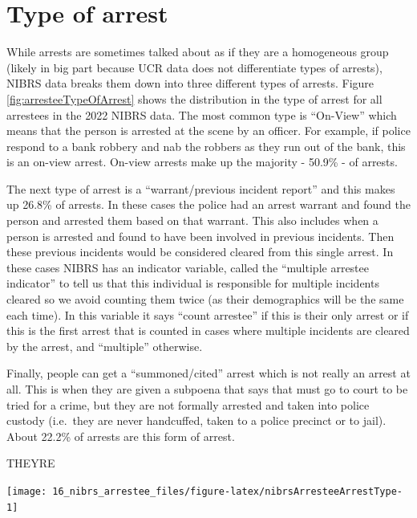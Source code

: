 \documentclass[
]{krantz}
\let\origfigure\figure
\let\endorigfigure\endfigure
\renewenvironment{figure}[1][2] {
    \expandafter\origfigure\expandafter[H]
} {
    \endorigfigure
}
\begin{document}
\section{Type of arrest}\label{type-of-arrest}

While arrests are sometimes talked about as if they are a
homogeneous group (likely in big part because UCR data does
not differentiate types of arrests), NIBRS data breaks them
down into three different types of arrests. Figure
\ref{fig:arresteeTypeOfArrest} shows the distribution in the
type of arrest for all arrestees in the 2022 NIBRS data. The
most common type is ``On-View'' which means that the person
is arrested at the scene by an officer. For example, if
police respond to a bank robbery and nab the robbers as they
run out of the bank, this is an on-view arrest. On-view
arrests make up the majority - 50.9\% - of arrests.

The next type of arrest is a ``warrant/previous incident
report'' and this makes up 26.8\% of arrests. In these cases
the police had an arrest warrant and found the person and
arrested them based on that warrant. This also includes when
a person is arrested and found to have been involved in
previous incidents. Then these previous incidents would be
considered cleared from this single arrest. In these cases
NIBRS has an indicator variable, called the ``multiple
arrestee indicator'' to tell us that this individual is
responsible for multiple incidents cleared so we avoid
counting them twice (as their demographics will be the same
each time). In this variable it says ``count arrestee'' if
this is their only arrest or if this is the first arrest
that is counted in cases where multiple incidents are
cleared by the arrest, and ``multiple'' otherwise.

Finally, people can get a ``summoned/cited'' arrest which is
not really an arrest at all. This is when they are given a
subpoena that says that must go to court to be tried for a
crime, but they are not formally arrested and taken into
police custody (i.e.~they are never handcuffed, taken to a
police precinct or to jail). About 22.2\% of arrests are
this form of arrest.

THEYRE

\begin{figure}

{\centering \texttt{[image: 16\_nibrs\_arrestee\_files/figure-latex/nibrsArresteeArrestType-1]} 

}

\caption{Annual arrest type for all arrestees, 1991-2022. Previous Incident Report includes cases where an individual was arrested for a separate crime and are then reported as also arrested for this incident.}\label{fig:nibrsArresteeArrestType}
\end{figure}
\end{document}
